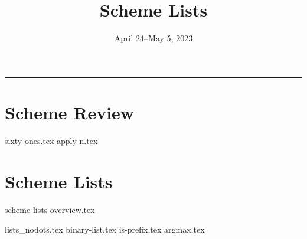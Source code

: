 \documentclass{exam}
\title{Scheme Lists}
\date{April 24--May 5, 2023}
\begin{document}
\maketitle\rule{\textwidth}{0.15em}

\section{Scheme Review}
\begin{questions}
    {sixty-ones.tex}
    {apply-n.tex}
\end{questions}

\section{Scheme Lists}
{scheme-lists-overview.tex}
\newpage
\begin{questions}
{lists_nodots.tex}
{binary-list.tex}
{is-prefix.tex}
{argmax.tex}
\end{questions}
\end{document}
